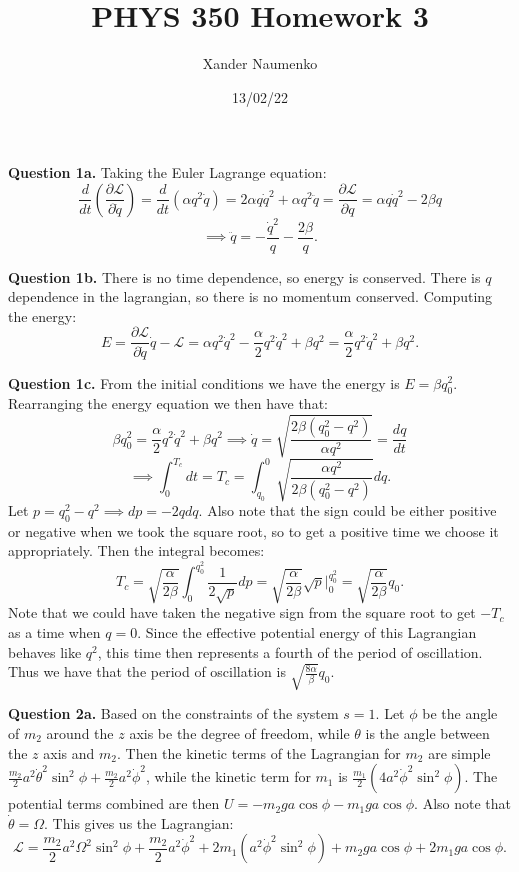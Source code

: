 \documentclass[letterpaper, reqno,11pt]{article}
\begin{document}
\title{PHYS 350 Homework 3}
\date{13/02/22}
\author{Xander Naumenko}
\maketitle

{\noindent\bf Question 1a.} Taking the Euler Lagrange equation: 
\[
\frac{d}{dt}\left( \frac{\partial\mathcal L}{\partial \dot q} \right)=\frac{d}{dt}\left( \alpha q^2\dot q\right)=2\alpha q\dot q^2+\alpha q^2\ddot q=\frac{\partial\mathcal L}{\partial q}=\alpha q\dot q^2-2\beta q
\]
\[
\implies\ddot q=-\frac{\dot q^2}{q}-\frac{2\beta}{q}
.\]

{\noindent\bf Question 1b.} There is no time dependence, so energy is conserved. There is $q$ dependence in the lagrangian, so there is no momentum conserved. Computing the energy: 
\[
E=\frac{\partial\mathcal L}{\partial \dot q}\dot q-\mathcal L=\alpha q^2\dot q^2-\frac{\alpha}{2}q^2\dot q^2+\beta q^2=\frac{\alpha}{2} q^2\dot q^2+\beta q^2
.\]

{\noindent\bf Question 1c.} From the initial conditions we have the energy is $E=\beta q_0^2$. Rearranging the energy equation we then have that: 
\[
\beta q_0^2=\frac{\alpha}{2} q^2\dot q^2+\beta q^2\implies \dot q=\sqrt{\frac{2\beta\left( q_0^2-q^2 \right) }{\alpha q^2}}=\frac{dq}{dt}
\]
\[
\implies \int_0^{T_c} dt=T_c=\int_{q_0}^0 \sqrt{\frac{\alpha q^2}{2\beta\left( q_0^2-q^2 \right) }} dq
.\]
Let $p=q_0^2-q^2\implies dp=-2qdq$. Also note that the sign could be either positive or negative when we took the square root, so to get a positive time we choose it appropriately. Then the integral becomes: 
\[
T_c=\sqrt{\frac{\alpha}{2\beta}} \int_{0}^{q_0^2} \frac{1}{2\sqrt{p} }dp=\sqrt{\frac{\alpha}{2\beta}}\sqrt{p} \bigg|_0^{q_0^2}=\sqrt{\frac{\alpha}{2\beta}} q_0
.\]
Note that we could have taken the negative sign from the square root to get $-T_c$ as a time when $q=0$. Since the effective potential energy of this Lagrangian behaves like $q^2$, this time then represents a fourth of the period of oscillation. Thus we have that the period of oscillation is $ \sqrt{\frac{8\alpha}{\beta}} q_0$. 

{\noindent\bf Question 2a.} Based on the constraints of the system $s=1$. Let $\phi$ be the angle of $ m_2$ around the $z$ axis be the degree of freedom, while $\theta$ is the angle between the $z$ axis and $m_2$. Then the kinetic terms of the Lagrangian for $m_2$ are simple $ \frac{m_2}{2}a^2\dot\theta ^2\sin^2\phi+\frac{m_2}{2}a^2\dot\phi^2 $, while the kinetic term for $m_1$ is $\frac{m_1}{2}\left( 4a^2\dot\phi^2\sin^2\phi \right) $. The potential terms combined are then $U=-m_2ga\cos\phi-m_1ga\cos\phi$. Also note that $\dot\theta=\Omega$. This gives us the Lagrangian: 
\[
\mathcal L=\frac{m_2}{2}a^2\Omega^2\sin^2\phi+\frac{m_2}{2}a^2\dot\phi^2+2m_1\left( a^2\dot\phi^2\sin^2\phi \right)+m_2ga\cos\phi+2m_1ga\cos\phi
.\]
\end{document}
